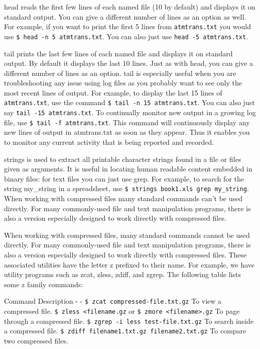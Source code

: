 head reads the first few lines of each named file (10 by default) and
displays it on standard output. You can give a different number of lines
as an option as well. For example, if you want to print the first 5
lines from \texttt{atmtrans.txt} you would use
\texttt{\$ head -n 5 atmtrans.txt}. You can also just use
\texttt{head -5 atmtrans.txt}.

tail prints the last few lines of each named file and displays it on
standard output. By default it displays the last 10 lines. Just as with
head, you can give a different number of lines as an option. tail is
especially useful when you are troubleshooting any issue using log files
as you probably want to see only the most recent lines of output. For
example, to display the last 15 lines of \texttt{atmtrans.txt}, use the
command \texttt{\$ tail -n 15 atmtrans.txt}. You can also just say
\texttt{tail -15 atmtrans.txt}. To continually monitor new output in a
growing log file, use \texttt{\$ tail -f atmtrans.txt}. This command
will continuously display any new lines of output in atmtrans.txt as
soon as they appear. Thus it enables you to monitor any current activity
that is being reported and recorded.

strings is used to extract all printable character strings found in a
file or files given as arguments. It is useful in locating human
readable content embedded in binary files: for text files you can just
use grep. For example, to search for the string my\_string in a
spreadsheet, use
\texttt{\$ strings book1.xls \textbar{} grep my\_string}. When working
with compressed files many standard commands can't be used directly. For
many commonly-used file and text manipulation programs, there is also a
version especially designed to work directly with compressed files.

When working with compressed files, many standard commands cannot be
used directly. For many commonly-used file and text manipulation
programs, there is also a version especially designed to work directly
with compressed files. These associated utilities have the letter z
prefixed to their name. For example, we have utility programs such as
zcat, zless, zdiff, and zgrep. The following table lists some z family
commands:

Command \textbar{} Description - \textbar{} -
\texttt{\$ zcat compressed-file.txt.gz} \textbar{} To view a compressed
file. \texttt{\$ zless \textless{}filename.gz} \n or
\n \texttt{\$ zmore \textless{}filename\textgreater{}.gz} \textbar{} To
page through a compressed file.
\texttt{\$ zgrep -i less test-file.txt.gz} \textbar{} To search inside a
compressed file. \texttt{\$ zdiff filename1.txt.gz filename2.txt.gz}
\textbar{} To compare two compressed files.

